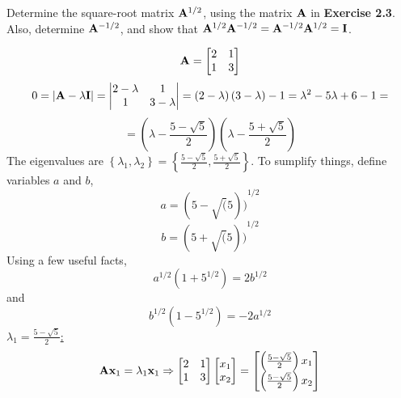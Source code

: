         Determine the square-root matrix $\bold{A}^{1/2}$, using the matrix $\bold{A}$ in \textbf{Exercise 2.3}. Also, determine
        $\bold{A}^{-1/2}$, and show that $\bold{A}^{1/2}\bold{A}^{-1/2} = \bold{A}^{-1/2}\bold{A}^{1/2} = \bold{I}$.
        \par
        \[
            \bold{A}
            =
            \begin{bmatrix}
                2 & 1 \\
                1 & 3
            \end{bmatrix}
        \]
        \[
            0 = \left|\bold{A} - \lambda\bold{I}\right|
            =
            \left|
            \begin{matrix}
                2 - \lambda & 1 \\
                1 & 3 - \lambda
            \end{matrix}
            \right|
            =
            \left(2 - \lambda\right)\left(3 - \lambda\right) - 1
            =
            \lambda^2 - 5\lambda + 6 - 1
            =
        \]
        \[
            =
            \left(\lambda - \frac{5 - \sqrt{5}}{2}\right)\left(\lambda - \frac{5 + \sqrt{5}}{2}\right)
        \]
        The eigenvalues are $\left\{\lambda_1, \lambda_2\right\} = \left\{\frac{5 - \sqrt{5}}{2}, \frac{5 + \sqrt{5}}{2}\right\}$.
        \newline
        To sumplify things, define variables $a$ and $b$,
        \[
            a = {(5-\sqrt(5))}^{1/2}
        \]
        \[
            b = {(5+\sqrt(5))}^{1/2}
        \]
        Using a few useful facts,
        \[
            a^{1/2}(1 + 5^{1/2}) = 2b^{1/2}
        \]
        and
        \[
            b^{1/2}(1 - 5^{1/2}) = -2a^{1/2}
        \]
        \underline{$\lambda_1 = \frac{5 - \sqrt{5}}{2}$:}
        \[
            \bold{A}\bold{x}_1 = \lambda_1 \bold{x}_1
            \Rightarrow
            \begin{bmatrix}
                2 & 1 \\
                1 & 3
            \end{bmatrix}
            \begin{bmatrix}
                x_1 \\
                x_2
            \end{bmatrix}
            =
            \begin{bmatrix}
                \left(\frac{5 - \sqrt{5}}{2}\right)x_1 \\
                \left(\frac{5 - \sqrt{5}}{2}\right)x_2
            \end{bmatrix}
        \]
